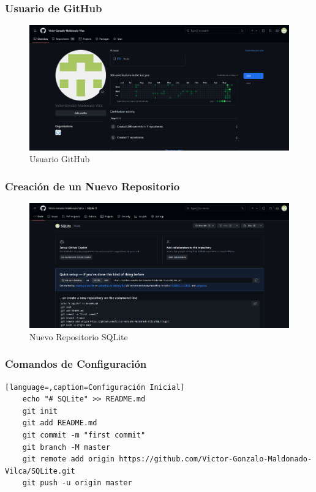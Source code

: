 \documentclass{article}
\begin{document}
	\subsubsection{Usuario de GitHub}
  \begin{figure}[H]
    \centering
    \includegraphics[width=1\textwidth, keepaspectratio]{img/usuario.png}
    \caption{Usuario GitHub}
  \end{figure}
  

  \subsubsection{Creación de un Nuevo Repositorio}
  \begin{figure}[H]
    \centering
    \includegraphics[width=1\textwidth, keepaspectratio]{img/crearRepo.png}
    \caption{Nuevo Repositorio SQLite}
  \end{figure}
  
	
  \newpage
  \subsubsection{Comandos de Configuración}
  \begin{lstlisting}[language=,caption=Configuración Inicial]
    echo "# SQLite" >> README.md
    git init
    git add README.md
    git commit -m "first commit"
    git branch -M master
    git remote add origin https://github.com/Victor-Gonzalo-Maldonado-Vilca/SQLite.git
    git push -u origin master
  \end{lstlisting}
  
\end{document}
